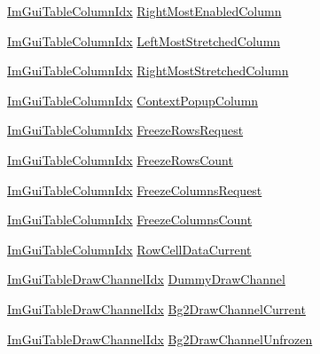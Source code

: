 \begin{DoxyCompactItemize}
\item 
\hyperlink{imgui__internal_8h_abe1882c8292cd23a77a54eda2407f147}{Im\+Gui\+Table\+Column\+Idx} \hyperlink{structImGuiTable_a8f297cc1ad1839a3039adf00e9f29047}{Right\+Most\+Enabled\+Column}
\item 
\hyperlink{imgui__internal_8h_abe1882c8292cd23a77a54eda2407f147}{Im\+Gui\+Table\+Column\+Idx} \hyperlink{structImGuiTable_a0e6b930bc9743fa9fe1067adf1d66830}{Left\+Most\+Stretched\+Column}
\item 
\hyperlink{imgui__internal_8h_abe1882c8292cd23a77a54eda2407f147}{Im\+Gui\+Table\+Column\+Idx} \hyperlink{structImGuiTable_a40e26ce4a610b6688c956ffa374ad0dc}{Right\+Most\+Stretched\+Column}
\item 
\hyperlink{imgui__internal_8h_abe1882c8292cd23a77a54eda2407f147}{Im\+Gui\+Table\+Column\+Idx} \hyperlink{structImGuiTable_aeda01405560dc7f5ba2a26081bf5499d}{Context\+Popup\+Column}
\item 
\hyperlink{imgui__internal_8h_abe1882c8292cd23a77a54eda2407f147}{Im\+Gui\+Table\+Column\+Idx} \hyperlink{structImGuiTable_aa90d00342e8c46396854b44101c7355d}{Freeze\+Rows\+Request}
\item 
\hyperlink{imgui__internal_8h_abe1882c8292cd23a77a54eda2407f147}{Im\+Gui\+Table\+Column\+Idx} \hyperlink{structImGuiTable_ad982334f307fbe429c1de62ef9da8caf}{Freeze\+Rows\+Count}
\item 
\hyperlink{imgui__internal_8h_abe1882c8292cd23a77a54eda2407f147}{Im\+Gui\+Table\+Column\+Idx} \hyperlink{structImGuiTable_a75f70ed643a861d05a22c566664e0eaf}{Freeze\+Columns\+Request}
\item 
\hyperlink{imgui__internal_8h_abe1882c8292cd23a77a54eda2407f147}{Im\+Gui\+Table\+Column\+Idx} \hyperlink{structImGuiTable_add0b2bf413de36eab591d5e376d2f0b4}{Freeze\+Columns\+Count}
\item 
\hyperlink{imgui__internal_8h_abe1882c8292cd23a77a54eda2407f147}{Im\+Gui\+Table\+Column\+Idx} \hyperlink{structImGuiTable_a3b2630067aff7df6e9111de94fcc5e3b}{Row\+Cell\+Data\+Current}
\item 
\hyperlink{imgui__internal_8h_aad84cfe70f5c1afb2c057b0284cbed03}{Im\+Gui\+Table\+Draw\+Channel\+Idx} \hyperlink{structImGuiTable_a1daad01c8bb3bc4194401c658b61a667}{Dummy\+Draw\+Channel}
\item 
\hyperlink{imgui__internal_8h_aad84cfe70f5c1afb2c057b0284cbed03}{Im\+Gui\+Table\+Draw\+Channel\+Idx} \hyperlink{structImGuiTable_a2963b4f92f924de8c1ef1fcb43a9e597}{Bg2\+Draw\+Channel\+Current}
\item 
\hyperlink{imgui__internal_8h_aad84cfe70f5c1afb2c057b0284cbed03}{Im\+Gui\+Table\+Draw\+Channel\+Idx} \hyperlink{structImGuiTable_aefc8289f98d409d303517159c521a4b0}{Bg2\+Draw\+Channel\+Unfrozen}

\end{DoxyCompactItemize}
